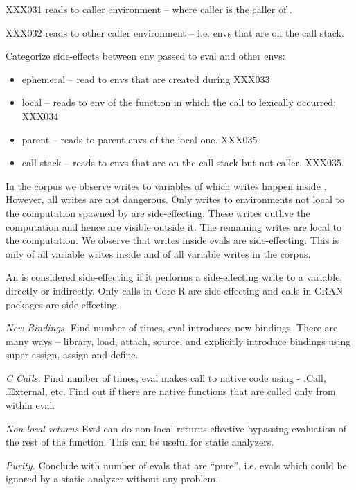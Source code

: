 \documentclass[acmsmall]{acmart}
\newcommand{\mypara}[1]{\medskip\noindent\emph{#1}\xspace}
\begin{document}
XXX031 reads to caller environment -- where caller is the caller of
\eval.

XXX032 reads to other caller environment -- i.e. envs that are on the
call stack.

Categorize side-effects between env passed to eval and other envs:
\begin{itemize}
\item ephemeral -- read to envs that are created during \eval  XXX033
\item local -- reads to env of the function in which the call to \eval
  lexically occurred; XXX034
\item parent -- reads to parent envs of the local one. XXX035
\item call-stack -- reads to envs that are on the call stack but not
  caller. XXX035.
\end{itemize}

In the corpus we observe \AllWritesRnd writes to variables of which
\EvalWritesRnd writes happen inside \eval. However, all writes are not
dangerous. Only writes to environments not local to the computation
spawned by \eval are side-effecting. These writes outlive the
computation and hence are visible outside it. The remaining writes are
local to the computation. We observe that \EvalSideEffectingWritesRnd
writes inside evals are side-effecting. This is only
\EvalSideEffectingWritesEvalPerc of all variable writes inside \eval
and \EvalSideEffectingWritesAllPerc of all variable writes in the
corpus.

An \eval is considered side-effecting if it performs a side-effecting
write to a variable, directly or indirectly. Only
\SideEffectingCoreCallPerc \eval calls in Core R are side-effecting
and \SideEffectingPackageCallPerc \eval calls in CRAN packages are
side-effecting.


\mypara{New Bindings.} Find number of times, eval introduces new
bindings. There are many ways -- library, load, attach, source, and
explicitly introduce bindings using super-assign, assign and define.

\mypara{C Calls.} Find number of times, eval makes call to native code
using - .Call, .External, etc. Find out if there are native functions
that are called only from within eval.

\mypara{Non-local returns}
Eval can do non-local returns effective bypassing evaluation of the
rest of the function. This can be useful for static analyzers.

\mypara{Purity.}
Conclude with number of evals that are ``pure'', i.e. evals which
could be ignored by a static analyzer without any problem.
\end{document}
